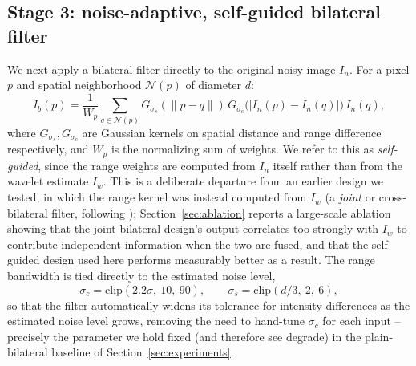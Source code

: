 \documentclass[final,3p,times,twocolumn,nopreprintline]{elsarticle}
\begin{document}
\subsection{Stage 3: noise-adaptive, self-guided bilateral filter}
\label{sec:stage3}
We next apply a bilateral filter directly to the original noisy image $I_n$. For a pixel $p$ and spatial neighborhood $\mathcal{N}(p)$ of diameter $d$:
\begin{equation}
I_b(p) = \frac{1}{W_p}\sum_{q \in \mathcal{N}(p)} G_{\sigma_s}(\lVert p-q \rVert)\, G_{\sigma_c}\!\big(|I_n(p)-I_n(q)|\big)\, I_n(q),
\label{eq:bf}
\end{equation}
where $G_{\sigma_s}, G_{\sigma_c}$ are Gaussian kernels on spatial distance and range difference respectively, and $W_p$ is the normalizing sum of weights. We refer to this as \emph{self-guided}, since the range weights are computed from $I_n$ itself rather than from the wavelet estimate $I_w$. This is a deliberate departure from an earlier design we tested, in which the range kernel was instead computed from $I_w$ (a \emph{joint} or cross-bilateral filter, following \cite{petschnigg2004digital}); Section~\ref{sec:ablation} reports a large-scale ablation showing that the joint-bilateral design's output correlates too strongly with $I_w$ to contribute independent information when the two are fused, and that the self-guided design used here performs measurably better as a result. The range bandwidth is tied directly to the estimated noise level,
\begin{equation}
\sigma_c = \mathrm{clip}(2.2\hat\sigma,\ 10,\ 90), \qquad \sigma_s = \mathrm{clip}(d/3,\ 2,\ 6),
\label{eq:adaptiveparams}
\end{equation}
so that the filter automatically widens its tolerance for intensity differences as the estimated noise level grows, removing the need to hand-tune $\sigma_c$ for each input -- precisely the parameter we hold fixed (and therefore see degrade) in the plain-bilateral baseline of Section~\ref{sec:experiments}.
\end{document}

